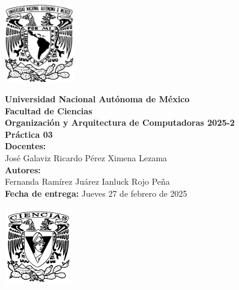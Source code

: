 \documentclass[12pt,letterpaper]{article}
\begin{document}
\begin{center}
\newcommand{\imp}{\rightarrow}
\newcommand{\vp}{\varphi}
  \begin{minipage}{3cm}
    \begin{center}
      \includegraphics[height=3.4cm]{unam_logo.png}
    \end{center}
  \end{minipage}\hfill
  \begin{minipage}{10cm}
    \begin{center}
      \textbf{\Large Universidad Nacional Autónoma de México}\\[0.2cm]
      \textbf{\large Facultad de Ciencias}\\[0.2cm]
      \textbf{Organización y Arquitectura de Computadoras 2025-2}\\[0.4cm]
      \textbf{\Large Práctica 03}\\[0.1cm]
      \textbf{Docentes:}\\
      José Galaviz \hspace{1em} Ricardo Pérez \hspace{1em} Ximena Lezama\\[0.3cm]
      \textbf{Autores:}\\
      Fernanda Ramírez Juárez \quad Ianluck Rojo Peña\\[0.3cm]
      \textbf{Fecha de entrega:} Jueves 27 de febrero de 2025
    \end{center}
  \end{minipage}\hfill
  \begin{minipage}{3cm}
    \begin{center}
      \includegraphics[height=3.4cm]{fc_logo.png}
    \end{center}
  \end{minipage}
\end{center}
\end{document}
